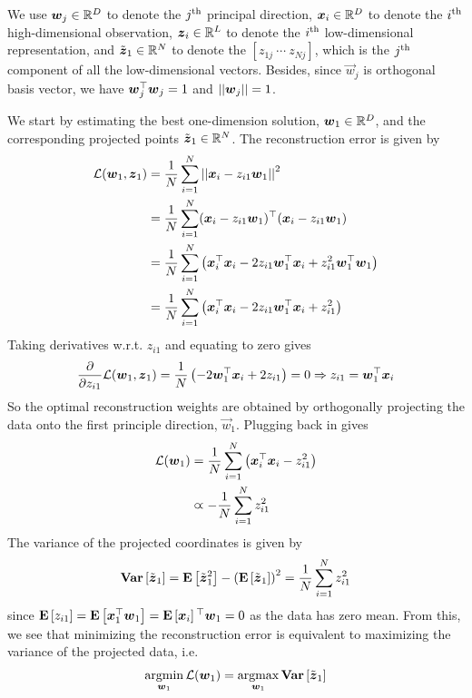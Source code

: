 We use $\boldsymbol{w}_j\in\mathbb{R}^D$ to denote the $j^\text{th}$ principal direction, $\boldsymbol{x}_i\in\mathbb{R}^D$ to denote the $i^\text{th}$ high-dimensional observation, $\boldsymbol{z}_i\in\mathbb{R}^L$ to denote the $i^\text{th}$ low-dimensional representation, and $\tilde{\boldsymbol{z}}_1\in\mathbb{R}^N$ to denote the $[z_{1j}\ \cdots\ z_{Nj}]$, which is the $j^\text{th}$ component of all the low-dimensional vectors. Besides, since $\vec{w}_j$ is orthogonal basis vector, we have $\boldsymbol{w}_j^\top\boldsymbol{w}_j=1$ and $\left\vert\left\vert \boldsymbol{w}_j \right\vert\right\vert=1$.

We start by estimating the best one-dimension solution, $\boldsymbol{w}_1\in\mathbb{R}^D$, and the corresponding projected points $\tilde{\boldsymbol{z}}_1\in\mathbb{R}^N$. The reconstruction error is given by
\begin{align*}
	\mathcal{L}(\boldsymbol{w}_1,\boldsymbol{z}_1)&=\frac{1}{N}\sum_{i=1}^N\left\vert\left\vert \boldsymbol{x}_i-z_{i1}\boldsymbol{w}_1 \right\vert\right\vert^2 \\
	&=\frac{1}{N}\sum_{i=1}^N(\boldsymbol{x}_i-z_{i1}\boldsymbol{w}_1){}^\top(\boldsymbol{x}_i-z_{i1}\boldsymbol{w}_1) \\
	&=\frac{1}{N}\sum_{i=1}^N\left(\boldsymbol{x}_i^\top\boldsymbol{x}_i-2z_{i1}\boldsymbol{w}_1^\top\boldsymbol{x}_i+z_{i1}^2\boldsymbol{w}_1^\top\boldsymbol{w}_1\right) \\
	&=\frac{1}{N}\sum_{i=1}^N\left(\boldsymbol{x}_i^\top\boldsymbol{x}_i-2z_{i1}\boldsymbol{w}_1^\top\boldsymbol{x}_i+z_{i1}^2\right)
\end{align*}
Taking derivatives w.r.t. $z_{i1}$ and equating to zero gives
\begin{align*}
	\frac{\partial}{\partial z_{i1}}\mathcal{L}(\boldsymbol{w}_1,\boldsymbol{z}_1)=\frac{1}{N}\left(-2\boldsymbol{w}_1^\top\boldsymbol{x}_i+2z_{i1}\right)=0\Rightarrow z_{i1}=\boldsymbol{w}_1^\top\boldsymbol{x}_i
\end{align*}
So the optimal reconstruction weights are obtained by orthogonally projecting the data onto the first principle direction, $\vec{w}_1$. Plugging back in gives
\begin{align*}
	\mathcal{L}(\boldsymbol{w}_1)&=\frac{1}{N}\sum_{i=1}^N\left(\boldsymbol{x}_i^\top\boldsymbol{x}_i-z_{i1}^2\right) \\
	&\varpropto-\frac{1}{N}\sum_{i=1}^Nz_{i1}^2
\end{align*}
The variance of the projected coordinates is given by
\begin{align*}
	\mathbf{Var}\left[\tilde{\boldsymbol{z}}_1\right]=\mathbf{E}\left[\tilde{\boldsymbol{z}}_1^2\right]-\left(\mathbf{E}\left[\tilde{\boldsymbol{z}}_1\right]\right)^2=\frac{1}{N}\sum_{i=1}^Nz_{i1}^2
\end{align*}
since $\mathbf{E}\left[z_{i1}\right]=\mathbf{E}\left[\boldsymbol{x}_1^\top\boldsymbol{w}_1\right]=\mathbf{E}\left[\boldsymbol{x}_i\right]{}^\top\boldsymbol{w}_1=0$ as the data has zero mean. From this, we see that minimizing the reconstruction error is equivalent to maximizing the variance of the projected data, i.e.
\begin{align*}
	\argmin_{\vec{w}_1}\cL(\vec{w}_1)=\argmax_{\vec{w}_1}\V{\ti{\vec{z}}_1}
\end{align*}
